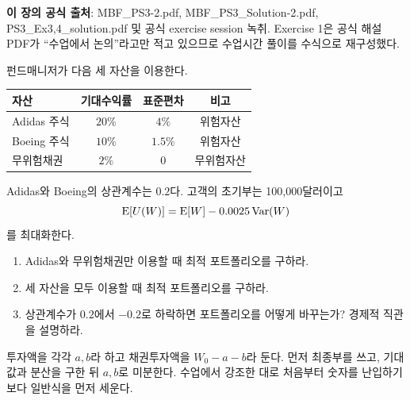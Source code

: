 
\begin{sourcebox}
\textbf{이 장의 공식 출처}: MBF\_PS3-2.pdf, MBF\_PS3\_Solution-2.pdf, PS3\_Ex3,4\_solution.pdf 및 공식 exercise session 녹취. Exercise 1은 공식 해설 PDF가 ``수업에서 논의''라고만 적고 있으므로 수업시간 풀이를 수식으로 재구성했다.
\end{sourcebox}

\begin{officialbox}
펀드매니저가 다음 세 자산을 이용한다.
\begin{center}
\begin{tabular}{lccc}
\toprule
자산 & 기대수익률 & 표준편차 & 비고 \\
\midrule
Adidas 주식 & $20\%$ & $4\%$ & 위험자산 \\
Boeing 주식 & $10\%$ & $1.5\%$ & 위험자산 \\
무위험채권 & $2\%$ & $0$ & 무위험자산 \\
\bottomrule
\end{tabular}
\end{center}
Adidas와 Boeing의 상관계수는 $0.2$다. 고객의 초기부는 100,000달러이고
\[
\operatorname{E}[U(W)]=\operatorname{E}[W]-0.0025\operatorname{Var}(W)
\]
를 최대화한다.
\begin{enumerate}[label=(\alph*)]
\item Adidas와 무위험채권만 이용할 때 최적 포트폴리오를 구하라.
\item 세 자산을 모두 이용할 때 최적 포트폴리오를 구하라.
\item 상관계수가 $0.2$에서 $-0.2$로 하락하면 포트폴리오를 어떻게 바꾸는가? 경제적 직관을 설명하라.
\end{enumerate}
\end{officialbox}

\begin{strategybox}
투자액을 각각 $a,b$라 하고 채권투자액을 $W_0-a-b$라 둔다. 먼저 최종부를 쓰고, 기대값과 분산을 구한 뒤 $a,b$로 미분한다. 수업에서 강조한 대로 처음부터 숫자를 난입하기보다 일반식을 먼저 세운다.
\end{strategybox}


